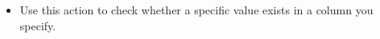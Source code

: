 
\begin{itemize}
\item Use this action to check whether a specific value exists in a column you specify. 
\end{itemize}
